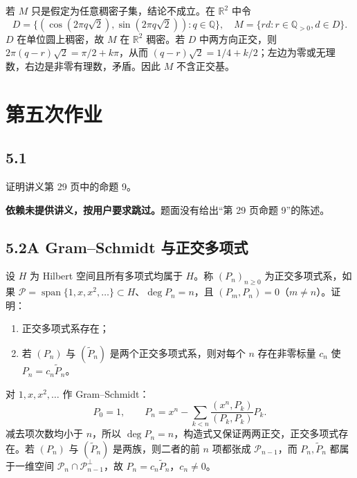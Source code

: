 若 $M$ 只是假定为任意稠密子集，结论不成立。在 $\mathbb R^2$ 中令
\[
D=\{(\cos(2\pi q\sqrt2),\sin(2\pi q\sqrt2)):q\in\mathbb Q\},\quad
M=\{rd:r\in\mathbb Q_{>0},d\in D\}.
\]
$D$ 在单位圆上稠密，故 $M$ 在 $\mathbb R^2$ 稠密。若 $D$ 中两方向正交，则
$2\pi(q-r)\sqrt2=\pi/2+k\pi$，从而 $(q-r)\sqrt2=1/4+k/2$；左边为零或无理数，右边是非零有理数，矛盾。因此 $M$ 不含正交基。

\section{第五次作业}

\subsection*{5.1}
\begin{problem}
证明讲义第 29 页中的命题 9。
\end{problem}
\textbf{依赖未提供讲义，按用户要求跳过。}题面没有给出“第 29 页命题 9”的陈述。

\subsection*{5.2A Gram--Schmidt 与正交多项式}
\begin{problem}
设 $H$ 为 Hilbert 空间且所有多项式均属于 $H$。称 $(P_n)_{n\ge0}$ 为正交多项式系，如果
$\mathcal P=\operatorname{span}\{1,x,x^2,\ldots\}\subset H$、$\deg P_n=n$，且
$(P_m,P_n)=0$（$m\ne n$）。证明：
\begin{enumerate}[label=(\arabic*)]
\item 正交多项式系存在；
\item 若 $(P_n)$ 与 $(\widetilde P_n)$ 是两个正交多项式系，则对每个 $n$ 存在非零标量 $c_n$ 使 $P_n=c_n\widetilde P_n$。
\end{enumerate}
\end{problem}
对 $1,x,x^2,\ldots$ 作 Gram--Schmidt：
\[
P_0=1,\qquad P_n=x^n-\sum_{k<n}\frac{(x^n,P_k)}{(P_k,P_k)}P_k.
\]
减去项次数均小于 $n$，所以 $\deg P_n=n$，构造式又保证两两正交，正交多项式存在。若 $(P_n)$ 与 $(\widetilde P_n)$ 是两族，则二者的前 $n$ 项都张成 $\mathcal P_{n-1}$，而 $P_n,\widetilde P_n$ 都属于一维空间 $\mathcal P_n\cap\mathcal P_{n-1}^{\perp}$，故 $P_n=c_n\widetilde P_n$，$c_n\ne0$。

